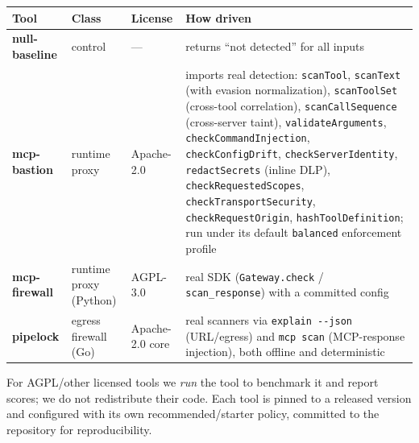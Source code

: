 \documentclass[
]{article}
\newcounter{none} %
\begin{document}
{\def\LTcaptype{none} %
\begin{longtable}[]{@{}
  >{\raggedright\arraybackslash}p{}
  >{\raggedright\arraybackslash}p{}
  >{\raggedright\arraybackslash}p{}
  >{\raggedright\arraybackslash}p{}@{}}
\toprule\noalign{}
\begin{minipage}[b]{\linewidth}\raggedright
Tool
\end{minipage} & \begin{minipage}[b]{\linewidth}\raggedright
Class
\end{minipage} & \begin{minipage}[b]{\linewidth}\raggedright
License
\end{minipage} & \begin{minipage}[b]{\linewidth}\raggedright
How driven
\end{minipage} \\
\midrule\noalign{}
\endhead
\bottomrule\noalign{}
\endlastfoot
\textbf{null-baseline} & control & --- & returns ``not detected'' for
all inputs \\
\textbf{mcp-bastion} & runtime proxy & Apache-2.0 & imports real
detection: \texttt{scanTool}, \texttt{scanText} (with evasion
normalization), \texttt{scanToolSet} (cross-tool correlation),
\texttt{scanCallSequence} (cross-server taint),
\texttt{validateArguments}, \texttt{checkCommandInjection},
\texttt{checkConfigDrift}, \texttt{checkServerIdentity},
\texttt{redactSecrets} (inline DLP), \texttt{checkRequestedScopes},
\texttt{checkTransportSecurity}, \texttt{checkRequestOrigin},
\texttt{hashToolDefinition}; run under its default \texttt{balanced}
enforcement profile \\
\textbf{mcp-firewall} & runtime proxy (Python) & AGPL-3.0 & real SDK
(\texttt{Gateway.check} / \texttt{scan\_response}) with a committed
config \\
\textbf{pipelock} & egress firewall (Go) & Apache-2.0 core & real
scanners via \texttt{explain\ -\/-json} (URL/egress) and
\texttt{mcp\ scan} (MCP-response injection), both offline and
deterministic \\
\end{longtable}
}

For AGPL/other licensed tools we \emph{run} the tool to benchmark it and
report scores; we do not redistribute their code. Each tool is pinned to
a released version and configured with its own recommended/starter
policy, committed to the repository for reproducibility.
\end{document}
